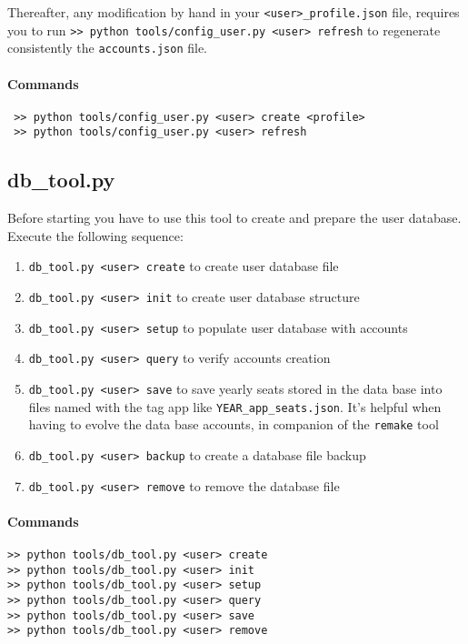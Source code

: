\documentclass[12pt, a4paper]{article}
\begin{document}
Thereafter, any modification by hand in your \verb!<user>_profile.json! file, requires you  to run \verb!>> python tools/config_user.py <user> refresh! to regenerate consistently the \verb!accounts.json! file. 
 
 \paragraph{Commands}
 \begin{verbatim}
 >> python tools/config_user.py <user> create <profile> 
 >> python tools/config_user.py <user> refresh
 \end{verbatim}
 \subsection{db\_tool.py}
 Before starting you have to use this tool to create and prepare the user database. 
 Execute the following sequence:
 \begin{enumerate}[wide, labelwidth=!, labelindent=0pt]
 \item \verb!db_tool.py <user> create! to create user database file
 \item \verb!db_tool.py <user> init! to create user database structure		
 \item \verb!db_tool.py <user> setup!	 to populate user database with accounts
 \item \verb!db_tool.py <user> query! to verify accounts creation
 \item \verb!db_tool.py <user> save! to save yearly seats stored in the data base into files named with the tag \textsf{app} like \verb!YEAR_app_seats.json!. It's helpful when having to evolve the data base accounts, in companion of the \verb!remake! tool
 \item \verb!db_tool.py <user> backup! to create a database file backup
 \item \verb!db_tool.py <user> remove! to remove the database file
\end{enumerate}
\paragraph{Commands}
\begin{verbatim}
>> python tools/db_tool.py <user> create
>> python tools/db_tool.py <user> init
>> python tools/db_tool.py <user> setup
>> python tools/db_tool.py <user> query
>> python tools/db_tool.py <user> save 
>> python tools/db_tool.py <user> remove
\end{verbatim}
\end{document}
